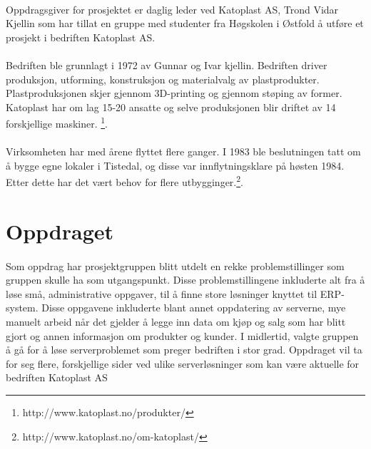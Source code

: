 \paragraph{} Oppdragsgiver for prosjektet er daglig leder ved Katoplast AS, Trond Vidar Kjellin som har tillat en gruppe med studenter fra Høgskolen i Østfold å utføre et prosjekt i bedriften Katoplast AS.

\paragraph{} Bedriften ble grunnlagt i 1972 av Gunnar og Ivar kjellin. Bedriften driver produksjon, utforming, konstruksjon og materialvalg av plastprodukter. Plastproduksjonen skjer gjennom 3D-printing og gjennom støping av former. Katoplast har om lag 15-20 ansatte og selve produksjonen blir driftet av 14 forskjellige maskiner. \footnote{http://www.katoplast.no/produkter/}.

\paragraph{}Virksomheten har med årene flyttet flere ganger. I 1983 ble beslutningen tatt om å bygge egne lokaler i Tistedal, og disse var innflytningsklare på høsten 1984. Etter dette har det vært behov for flere utbygginger.\footnote{http://www.katoplast.no/om-katoplast/}.

\section{Oppdraget}
\paragraph{} Som oppdrag har prosjektgruppen blitt utdelt en rekke problemstillinger som gruppen skulle ha som utgangspunkt. Disse problemstillingene inkluderte alt fra å løse små, administrative oppgaver, til å finne store løsninger knyttet til ERP-system. Disse oppgavene inkluderte blant annet oppdatering av serverne, mye manuelt arbeid når det gjelder å legge inn data om kjøp og salg som har blitt gjort og annen informasjon om produkter og kunder.  I midlertid, valgte gruppen å gå for å løse serverproblemet som preger bedriften i stor grad. Oppdraget vil ta for seg flere, forskjellige sider ved ulike serverløsninger som kan være aktuelle for bedriften Katoplast AS

